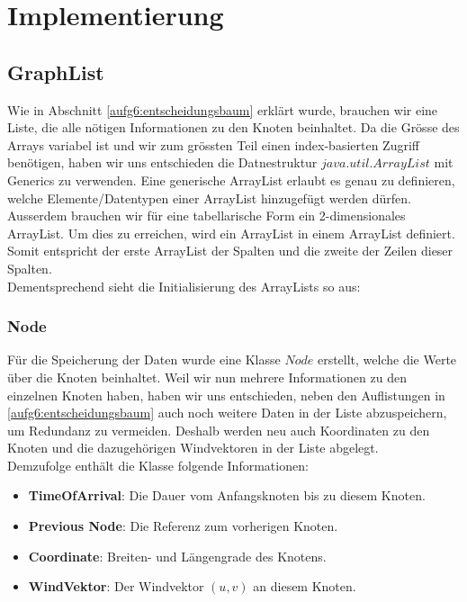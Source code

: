 \section{Implementierung}

\subsection{GraphList}
Wie in Abschnitt \ref{aufg6:entscheidungsbaum} erklärt wurde, brauchen wir eine Liste, die alle nötigen Informationen zu den Knoten beinhaltet. Da die Grösse des Arrays variabel ist und wir zum grössten Teil einen index-basierten Zugriff benötigen, haben wir uns entschieden die Datnestruktur $java.util.ArrayList$ mit Generics zu verwenden. Eine generische ArrayList erlaubt es genau zu definieren, welche Elemente/Datentypen einer ArrayList hinzugefügt werden dürfen. Ausserdem brauchen wir für eine tabellarische Form ein 2-dimensionales ArrayList. Um dies zu erreichen, wird ein ArrayList in einem ArrayList definiert. Somit entspricht der erste ArrayList der Spalten und die zweite der Zeilen dieser Spalten. \\
Dementsprechend sieht die Initialisierung des ArrayLists so aus:



\subsubsection{Node}
Für die Speicherung der Daten wurde eine Klasse $Node$ erstellt, welche die Werte über die Knoten beinhaltet. Weil wir nun mehrere Informationen zu den einzelnen Knoten haben, haben wir uns entschieden, neben den Auflistungen in \ref{aufg6:entscheidungsbaum} auch noch weitere Daten in der Liste abzuspeichern, um Redundanz zu vermeiden. Deshalb werden neu auch Koordinaten zu den Knoten und die dazugehörigen Windvektoren in der Liste abgelegt. \\
Demzufolge enthält die Klasse folgende Informationen:
\begin{itemize}
\item \textbf{TimeOfArrival}: Die Dauer vom Anfangsknoten bis zu diesem Knoten.
\item \textbf{Previous Node}: Die Referenz zum vorherigen Knoten.
\item \textbf{Coordinate}: Breiten- und Längengrade des Knotens.
\item \textbf{WindVektor}: Der Windvektor $(u, v)$ an diesem Knoten.
\end{itemize}


